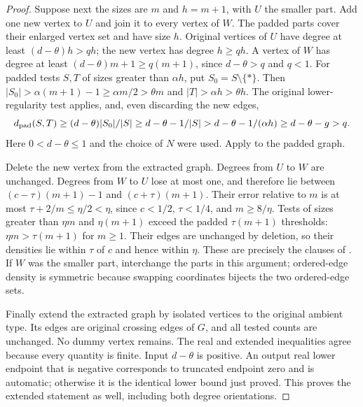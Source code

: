\begin{proof}
Suppose next the sizes are $m$ and $h=m+1$, with $U$ the smaller
part. Add one new vertex to $U$ and join it to every vertex of $W$.
The padded parts cover their enlarged vertex set and have size $h$.
Original vertices of $U$ have degree at least $(d-\theta)h>qh$;
the new vertex has degree $h\geq qh$. A vertex of $W$ has degree
at least $(d-\theta)m+1\geq q(m+1)$, since $d-\theta>q$ and $q<1$.
For padded tests $S,T$ of sizes greater than $\alpha h$, put
$S_0=S\setminus\{*\}$. Then
$|S_0|>\alpha(m+1)-1\geq\alpha m/2>\theta m$
and $|T|>\alpha h>\theta h$. The original lower-regularity
test applies, and, even discarding the new edges,
\[
 d_{\rm pad}(S,T)\geq(d-\theta)|S_0|/|S|
 \geq d-\theta-1/|S|>d-\theta-1/(\alpha h)
 \geq d-\theta-g>q.
\]
Here $0<d-\theta\leq1$ and the choice of $N$ were used.
Apply  to the padded graph.

Delete the new vertex from the extracted graph. Degrees from $U$
to $W$ are unchanged. Degrees from $W$ to $U$ lose at most one,
and therefore lie between $(c-\tau)(m+1)-1$ and
$(c+\tau)(m+1)$. Their error relative to $m$ is at most
$\tau+2/m\leq\eta/2<\eta$, since $c<1/2$, $\tau<1/4$,
and $m\geq8/\eta$. Tests of sizes greater than $\eta m$ and
$\eta(m+1)$ exceed the padded $\tau(m+1)$ thresholds:
$\eta m>\tau(m+1)$ for $m\geq1$. Their edges are unchanged
by deletion, so their densities lie within $\tau$ of $c$ and hence
within $\eta$. These are precisely the clauses of
. If $W$ was the smaller part, interchange
the parts in this argument; ordered-edge density is symmetric because
swapping coordinates bijects the two ordered-edge sets.

Finally extend the extracted graph by isolated vertices to the original
ambient type. Its edges are original crossing edges of $G$, and all
tested counts are unchanged. No dummy vertex remains. The real and
extended inequalities agree because every quantity is finite. Input
$d-\theta$ is positive. An output real lower endpoint that is negative
corresponds to truncated endpoint zero and is automatic; otherwise it
is the identical lower bound just proved. This proves the extended
statement as well, including both degree orientations.
\end{proof}
